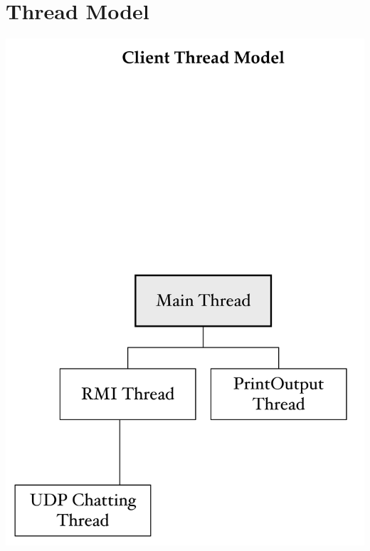 \documentclass{article}
\begin{document}
\section{Thread Model}
\includegraphics[scale=0.05]{Client}
\end{document}

